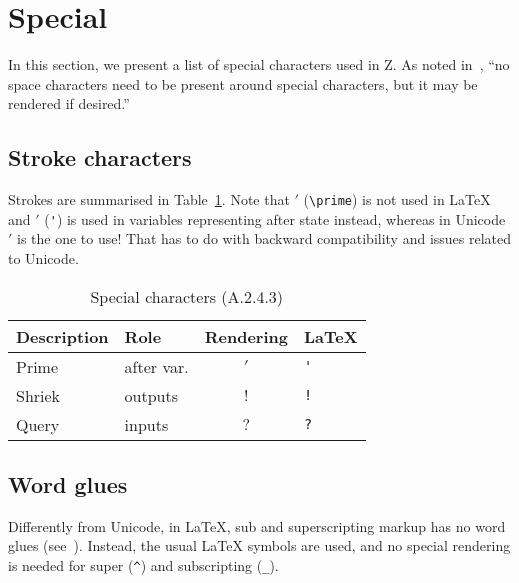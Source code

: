 \documentclass{article}
\newcommand{\smallcaption}[1]{{\small (#1)}}
\begin{document}
\section{Special}\label{sec:special}

In this section, we present a list of special characters used in Z.
As noted in~\cite[A.2.4.3]{isoz}, ``no space characters need to be
present around special characters, but it may be rendered if desired.''

\subsection{Stroke characters}\label{sec:special-strokes}

Strokes are summarised in Table~\ref{tbl:special-strokes}.
Note that $\prime$ (\verb|\prime|) is not used in \LaTeX{}
and $'$ (\verb|'|) is used in variables representing after state
instead, whereas in Unicode $\prime$ is the one to use! That has to
do with backward compatibility and issues related to Unicode.
%
\begin{table}[ht]
\centering
\begin{tabular}{|l|l|c|l|}
   \hline
   \textbf{Description} & \textbf{Role} & \textbf{Rendering} & \textbf{\LaTeX} \\
   \hline
   Prime  & after var. & $'$ & \verb|'| \\
   \hline
   Shriek & outputs    & $!$ & \verb|!| \\
   \hline
   Query  & inputs     & $?$ & \verb|?| \\
   \hline
\end{tabular}
\caption{Special characters \smallcaption{A.2.4.3}}\label{tbl:special-strokes}
\end{table}

\subsection{Word glues}\label{sec:special-wordglue}

Differently from Unicode, in \LaTeX, sub and superscripting markup
has no word glues (see~\cite[A.2.4.3]{isoz}). Instead, the usual
\LaTeX{} symbols are used, and no special rendering is needed
for super (\verb|^|) and subscripting (\verb|_|).

\end{document}
